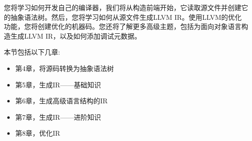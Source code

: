 

您将学习如何开发自己的编译器，我们将从构造前端开始，它读取源文件并创建它的抽象语法树。然后，您将学习如何从源文件生成LLVM IR。使用LLVM的优化功能，您将创建优化的机器码。您还将了解更多高级主题，包括为面向对象语言构造生成LLVM IR，以及如何添加调试元数据。\par

本节包括以下几章:\par

\begin{itemize}
	\item 第4章，将源码转换为抽象语法树
	\item 第5章，生成IR——基础知识
	\item 第6章，生成高级语言结构的IR
	\item 第7章，生成IR——进阶知识
	\item 第8章，优化IR
\end{itemize}

\newpage
